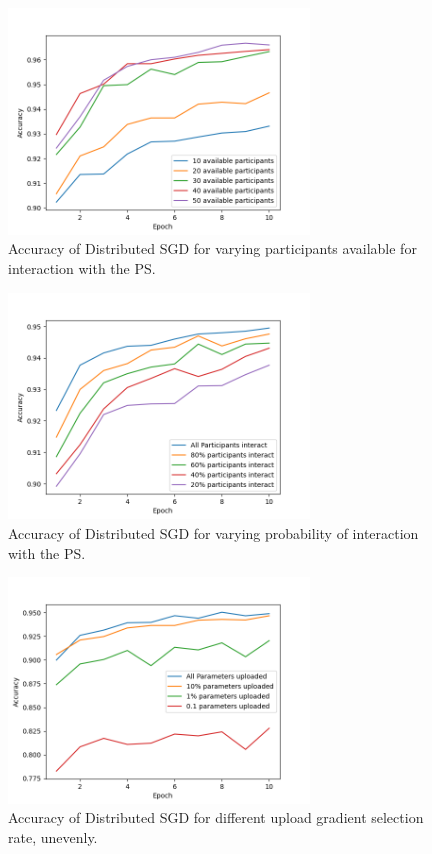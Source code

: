 \documentclass[conference]{IEEEtran}
\begin{document}
\begin{figure}[!h]
\includegraphics[width=8cm, keepaspectratio]{VaryingPoolofParticipants}
\caption{Accuracy of Distributed SGD for varying participants available for interaction with the PS.}
\label{fig:VaryingPoolofParticipants}
\end{figure}

\begin{figure}[!h]
\includegraphics[width=8cm, keepaspectratio]{VaryingProbabilityInteraction}
\caption{Accuracy of Distributed SGD for varying probability of interaction with the PS. }
\label{fig:VaryingProbabilityInteraction}
\end{figure}


\begin{figure}[!h]
\includegraphics[width=8cm, keepaspectratio]{VaryingThetaU}
\caption{Accuracy of Distributed SGD for different upload gradient selection rate, unevenly. }
\label{fig:VaryingThetaU}
\end{figure}
\end{document}
